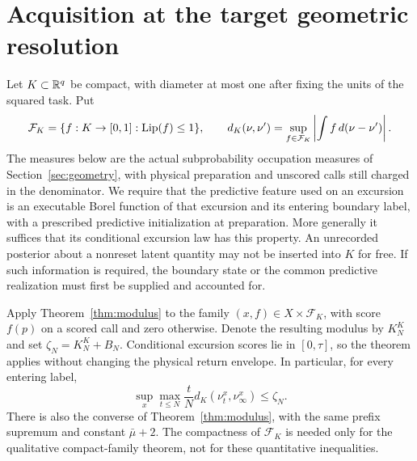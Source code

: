 \section{Acquisition at the target geometric resolution}\label{sec:resolution}
Let $K\subset\mathbb R^q$ be compact, with diameter at most one after fixing the units of the squared task. Put
\[
 \mathcal F_K=\{f:K\to[0,1]:\operatorname{Lip}(f)\le1\},\qquad
 d_K(\nu,\nu')=\sup_{f\in\mathcal F_K}\left|\int f\,d(\nu-\nu')\right|.
\]
The measures below are the actual subprobability occupation measures of Section~\ref{sec:geometry}, with physical preparation and unscored calls still charged in the denominator. We require that the predictive feature used on an excursion is an executable Borel function of that excursion and its entering boundary label, with a prescribed predictive initialization at preparation. More generally it suffices that its conditional excursion law has this property. An unrecorded posterior about a nonreset latent quantity may not be inserted into $K$ for free. If such information is required, the boundary state or the common predictive realization must first be supplied and accounted for.

Apply Theorem~\ref{thm:modulus} to the family $(x,f)\in X\times\mathcal F_K$, with score $f(p)$ on a scored call and zero otherwise. Denote the resulting modulus by $K_N^{K}$ and set $\zeta_N=K_N^{K}+B_N$. Conditional excursion scores lie in $[0,\tau]$, so the theorem applies without changing the physical return envelope. In particular, for every entering label,
\begin{equation}\label{eq:occupation-prefix}
 \sup_x\max_{t\le N}\frac tN
       d_K(\nu_t^x,\nu_\infty^x)\le\zeta_N.
\end{equation}
There is also the converse of Theorem~\ref{thm:modulus}, with the same prefix supremum and constant $\bar\mu+2$. The compactness of $\mathcal F_K$ is needed only for the qualitative compact-family theorem, not for these quantitative inequalities.

